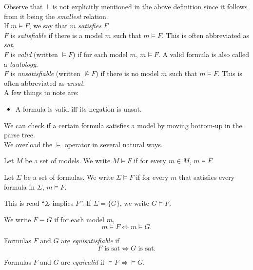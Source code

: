 Observe that $\bot$ is not explicitly mentioned in the above definition since it follows from it being the \textit{smallest} relation.\\

If $m\vDash F$, we say that $m$ \textit{satisfies} $F$.\\
$F$ is \textit{satisfiable} if there is a model $m$ such that $m\vDash F$. This is often abbreviated as \textit{sat}.\\
$F$ is \textit{valid} (written $\vDash F$) if for each model $m$, $m\vDash F$. A valid formula is also called a \textit{tautology}.\\
$F$ is \textit{unsatisfiable} (written $\nvDash F$) if there is no model $m$ such that $m\vDash F$. This is often abbreviated as \textit{unsat}.\\

A few things to note are:
\begin{itemize}
	\item A formula is valid iff its negation is unsat.
\end{itemize}

We can check if a certain formula satisfies a model by moving bottom-up in the parse tree.\\

We overload the $\vDash$ operator in several natural ways.

\begin{definition}
Let $M$ be a set of models. We write $M\vDash F$ if for every $m\in M$, $m\vDash F$.
\end{definition}

\begin{definition}
Let $\Sigma$ be a set of formulas. We write $\Sigma\vDash F$ if for every $m$ that satisfies every formula in $\Sigma$, $m\vDash F$.
\end{definition}

This is read ``$\Sigma$ implies $F$''. If $\Sigma=\{G\}$, we write $G\vDash F$.

\begin{definition}
We write $F\equiv G$ if for each model $m$,
\[ m\vDash F \iff m\vDash G. \]
\end{definition}

\begin{definition}
Formulas $F$ and $G$ are \textit{equisatisfiable} if
\[ F \text{ is sat} \iff G \text{ is sat.}\]
\end{definition}

\begin{definition}
Formulas $F$ and $G$ are \textit{equivalid} if $\vDash F\iff\vDash G$.
\end{definition}

